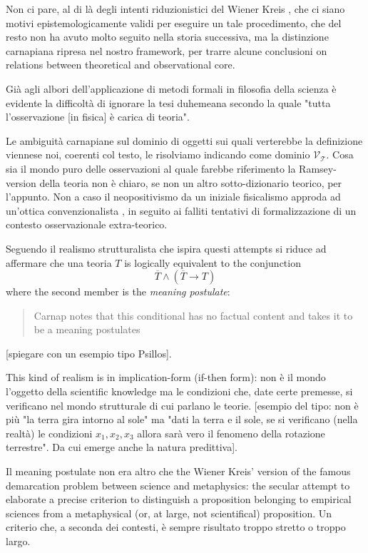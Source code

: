 Non ci pare, al di là degli intenti riduzionistici del Wiener Kreis \cite{?}, che ci siano motivi epistemologicamente validi per eseguire un tale procedimento, che del resto non ha avuto molto seguito nella storia successiva, ma la distinzione carnapiana ripresa nel nostro framework, per trarre alcune conclusioni on relations between theoretical and observational core.

Già agli albori dell'applicazione di metodi formali in filosofia della scienza è evidente la difficoltà di ignorare la tesi duhemeana secondo la quale "tutta l'osservazione [in fisica] è carica di teoria". 

Le ambiguità carnapiane sul dominio di oggetti sui quali verterebbe la definizione viennese noi, coerenti col testo, le risolviamo indicando come dominio $\mathcal{V_T}$. Cosa sia il mondo puro delle osservazioni al quale farebbe riferimento la Ramsey-version della teoria non è chiaro, se non un altro sotto-dizionario teorico, per l'appunto. Non a caso il neopositivismo da un iniziale fisicalismo approda ad un'ottica convenzionalista \cite{?}, in seguito ai falliti tentativi di formalizzazione di un contesto osservazionale extra-teorico. 

Seguendo \cite{?} il realismo strutturalista che ispira questi attempts si riduce ad affermare che una teoria $T$ is logically equivalent to the conjunction
\[\overline{T} \land (\overline{T} \rightarrow T)
\] where the second member is the \emph{meaning postulate}:
\begin{quotation}
	Carnap notes that this conditional has no factual content and takes it to be a meaning postulates \cite{?}
\end{quotation}
[spiegare con un esempio tipo Psillos].

This kind of realism is in implication-form (if-then form): non è il mondo l'oggetto della scientific knowledge ma le condizioni che, date certe premesse, si verificano nel mondo strutturale di cui parlano le teorie. [esempio del tipo: non è più "la terra gira intorno al sole" ma "dati la terra e il sole, se si verificano (nella realtà) le condizioni $x_1,x_2,x_3$ allora sarà vero il fenomeno della rotazione terrestre". Da cui emerge anche la natura predittiva]. 

Il meaning postulate non era altro che the Wiener Kreis' version of the famous demarcation problem between science and metaphysics: the secular attempt to elaborate a precise criterion to distinguish a proposition belonging to empirical sciences from a metaphysical (or, at large, not scientifical) proposition. Un criterio che, a seconda dei contesti, è sempre risultato troppo stretto o troppo largo. 

